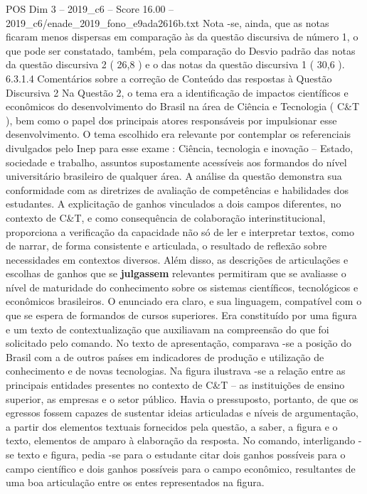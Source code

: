 \begin{textsample}{POS Dim 3 – 2019\_c6 – Score 16.00 – 2019\_c6/enade\_2019\_fono\_e9ada2616b.txt}
Nota -se, ainda, que as notas ficaram menos dispersas em comparação às da questão discursiva de número 1, o que pode ser constatado, também, pela comparação do Desvio padrão das notas da questão discursiva 2 ( 26,8 ) e o das notas da questão discursiva 1 ( 30,6 ). 6.3.1.4 Comentários sobre a correção de Conteúdo das respostas à Questão Discursiva 2 Na Questão 2, o tema era a identificação de impactos científicos e econômicos do desenvolvimento do Brasil na área de Ciência e Tecnologia ( C\&T ), bem como o papel dos principais atores responsáveis por impulsionar esse desenvolvimento.
O tema escolhido era relevante por contemplar os referenciais divulgados pelo Inep para esse exame : Ciência, tecnologia e inovação – Estado, sociedade e trabalho, assuntos supostamente acessíveis aos formandos do nível universitário brasileiro de qualquer área.
A análise da questão demonstra sua conformidade com as diretrizes de avaliação de competências e habilidades dos estudantes.
A explicitação de ganhos vinculados a dois campos diferentes, no contexto de C\&T, e como consequência de colaboração interinstitucional, proporciona a verificação da capacidade não só de ler e interpretar textos, como de narrar, de forma consistente e articulada, o resultado de reflexão sobre necessidades em contextos diversos.
Além disso, as descrições de articulações e escolhas de ganhos que se \textbf{julgassem} relevantes permitiram que se avaliasse o nível de maturidade do conhecimento sobre os sistemas científicos, tecnológicos e econômicos brasileiros.
O enunciado era claro, e sua linguagem, compatível com o que se espera de formandos de cursos superiores.
Era constituído por uma figura e um texto de contextualização que auxiliavam na compreensão do que foi solicitado pelo comando.
No texto de apresentação, comparava -se a posição do Brasil com a de outros países em indicadores de produção e utilização de conhecimento e de novas tecnologias.
Na figura ilustrava -se a relação entre as principais entidades presentes no contexto de C\&T – as instituições de ensino superior, as empresas e o setor público.
Havia o pressuposto, portanto, de que os egressos fossem capazes de sustentar ideias articuladas e níveis de argumentação, a partir dos elementos textuais fornecidos pela questão, a saber, a figura e o texto, elementos de amparo à elaboração da resposta.
No comando, interligando -se texto e figura, pedia -se para o estudante citar dois ganhos possíveis para o campo científico e dois ganhos possíveis para o campo econômico, resultantes de uma boa articulação entre os entes representados na figura.

\end{textsample}

